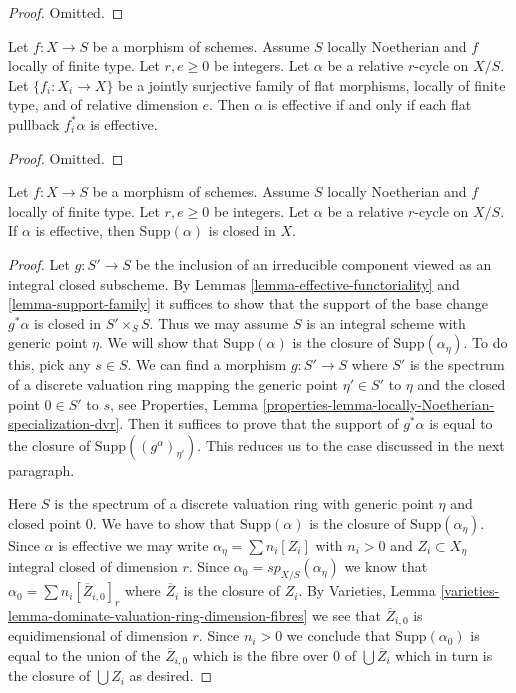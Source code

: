 \begin{proof}
Omitted.
\end{proof}

\begin{lemma}
\label{lemma-effective-descent-pullbacks}
Let $f : X \to S$ be a morphism of schemes. Assume $S$ locally Noetherian
and $f$ locally of finite type. Let $r, e \geq 0$ be integers.
Let $\alpha$ be a relative $r$-cycle on $X/S$.
Let $\{f_i : X_i \to X\}$ be a jointly surjective family
of flat morphisms, locally of finite type, and of relative dimension $e$.
Then $\alpha$ is effective if and only if each flat
pullback $f_i^*\alpha$ is effective.
\end{lemma}

\begin{proof}
Omitted.
\end{proof}

\begin{lemma}
\label{lemma-effective-support-closed}
Let $f : X \to S$ be a morphism of schemes. Assume $S$ locally Noetherian
and $f$ locally of finite type. Let $r, e \geq 0$ be integers.
Let $\alpha$ be a relative $r$-cycle on $X/S$.
If $\alpha$ is effective, then $\text{Supp}(\alpha)$ is
closed in $X$.
\end{lemma}

\begin{proof}
Let $g : S' \to S$ be the inclusion of an irreducible component
viewed as an integral closed subscheme. By
Lemmas \ref{lemma-effective-functoriality} and \ref{lemma-support-family}
it suffices to show that the support of the base change
$g^*\alpha$ is closed in $S' \times_S S$.
Thus we may assume $S$ is an integral scheme with generic point
$\eta$. We will show that $\text{Supp}(\alpha)$ is the closure
of $\text{Supp}(\alpha_\eta)$. To do this, pick any $s \in S$.
We can find a morphism $g : S' \to S$ where $S'$ is the spectrum
of a discrete valuation ring mapping the generic point $\eta' \in S'$ to $\eta$
and the closed point $0 \in S'$ to $s$, see
Properties, Lemma \ref{properties-lemma-locally-Noetherian-specialization-dvr}.
Then it suffices to prove that the support of $g^*\alpha$
is equal to the closure of $\text{Supp}((g^\alpha)_{\eta'})$.
This reduces us to the case discussed in the next paragraph.

\medskip\noindent
Here $S$ is the spectrum of a discrete valuation ring with generic
point $\eta$ and closed point $0$. We have to show that
$\text{Supp}(\alpha)$ is the closure of $\text{Supp}(\alpha_\eta)$.
Since $\alpha$ is effective we may write $\alpha_\eta = \sum n_i[Z_i]$
with $n_i > 0$ and $Z_i \subset X_\eta$ integral closed of dimension $r$.
Since $\alpha_0 = sp_{X/S}(\alpha_\eta)$ we know that
$\alpha_0 = \sum n_i [\overline{Z}_{i, 0}]_r$ where $\overline{Z}_i$
is the closure of $Z_i$. By Varieties, Lemma
\ref{varieties-lemma-dominate-valuation-ring-dimension-fibres}
we see that $\overline{Z}_{i, 0}$ is equidimensional of dimension $r$.
Since $n_i > 0$ we conclude that $\text{Supp}(\alpha_0)$
is equal to the union of the $\overline{Z}_{i, 0}$ which
is the fibre over $0$ of $\bigcup \overline{Z}_i$ which
in turn is the closure of $\bigcup Z_i$ as desired.
\end{proof}

